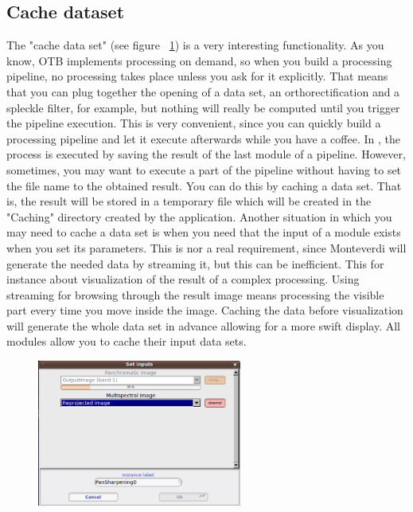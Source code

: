 \subsection{Cache dataset}
The "cache data set" (see figure ~\ref{fig:cachingmodule}) is a very
interesting functionality. As you know, OTB implements processing on
demand, so when you build a processing pipeline, no processing takes
place unless you ask for it explicitly. That means that you can plug
together the opening of a data set, an orthorectification and a
spleckle filter, for example, but nothing will really be computed
until you trigger the pipeline execution. This is very convenient,
since you can quickly build a processing pipeline and let it execute
afterwards while you have a coffee. In \mont, the process is executed
by saving the result of the last module of a pipeline. However,
sometimes, you may want to execute a part of the pipeline without
having to set the file name to the obtained result. You can do this by
caching a data set. That is, the result will be stored in a temporary
file which will be created in the "Caching" directory created by the
application. Another situation in which you may need to cache a data
set is when you need that the input of a module exists when you set
its parameters. This is nor a real requirement, since Monteverdi will
generate the needed data by streaming it, but this can be
inefficient. This for instance about visualization of the result of a
complex processing. Using streaming for browsing through the result
image means processing the visible part every time you move inside the
image. Caching the data before visualization will generate the whole
data set in advance allowing for a more swift display. All modules
allow you to cache their input data sets.

\begin{figure}
  \center
  \includegraphics[width=0.6\textwidth]{../Art/MonteverdiImages/monteverdi_caching_module.png}
  \label{fig:cachingmodule}
\end{figure}

